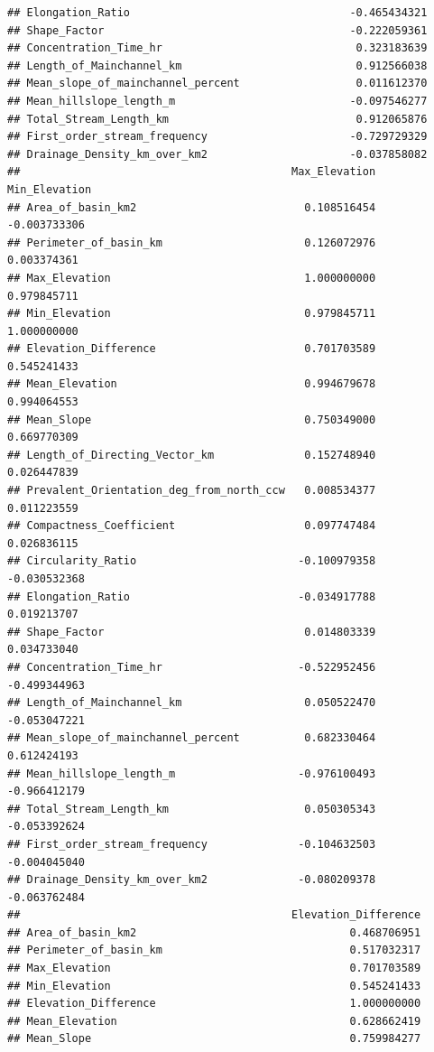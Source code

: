 \documentclass[11pt,]{article}
\begin{document}
\begin{verbatim}
## Elongation_Ratio                                  -0.465434321
## Shape_Factor                                      -0.222059361
## Concentration_Time_hr                              0.323183639
## Length_of_Mainchannel_km                           0.912566038
## Mean_slope_of_mainchannel_percent                  0.011612370
## Mean_hillslope_length_m                           -0.097546277
## Total_Stream_Length_km                             0.912065876
## First_order_stream_frequency                      -0.729729329
## Drainage_Density_km_over_km2                      -0.037858082
##                                          Max_Elevation Min_Elevation
## Area_of_basin_km2                          0.108516454  -0.003733306
## Perimeter_of_basin_km                      0.126072976   0.003374361
## Max_Elevation                              1.000000000   0.979845711
## Min_Elevation                              0.979845711   1.000000000
## Elevation_Difference                       0.701703589   0.545241433
## Mean_Elevation                             0.994679678   0.994064553
## Mean_Slope                                 0.750349000   0.669770309
## Length_of_Directing_Vector_km              0.152748940   0.026447839
## Prevalent_Orientation_deg_from_north_ccw   0.008534377   0.011223559
## Compactness_Coefficient                    0.097747484   0.026836115
## Circularity_Ratio                         -0.100979358  -0.030532368
## Elongation_Ratio                          -0.034917788   0.019213707
## Shape_Factor                               0.014803339   0.034733040
## Concentration_Time_hr                     -0.522952456  -0.499344963
## Length_of_Mainchannel_km                   0.050522470  -0.053047221
## Mean_slope_of_mainchannel_percent          0.682330464   0.612424193
## Mean_hillslope_length_m                   -0.976100493  -0.966412179
## Total_Stream_Length_km                     0.050305343  -0.053392624
## First_order_stream_frequency              -0.104632503  -0.004045040
## Drainage_Density_km_over_km2              -0.080209378  -0.063762484
##                                          Elevation_Difference
## Area_of_basin_km2                                 0.468706951
## Perimeter_of_basin_km                             0.517032317
## Max_Elevation                                     0.701703589
## Min_Elevation                                     0.545241433
## Elevation_Difference                              1.000000000
## Mean_Elevation                                    0.628662419
## Mean_Slope                                        0.759984277

\end{verbatim}
\end{document}
